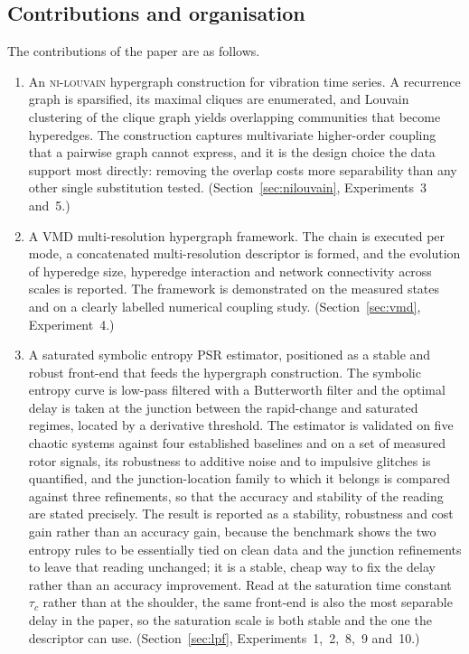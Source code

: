 \documentclass[10pt,a4paper,twocolumn]{article}
\newcommand{\nilouvain}{\textsc{ni-louvain}}
\begin{document}
\subsection{Contributions and organisation}

The contributions of the paper are as follows.

\begin{enumerate}
\item An \nilouvain{} hypergraph construction for vibration time series.  A
recurrence graph is sparsified, its maximal cliques are enumerated, and
Louvain clustering of the clique graph yields overlapping communities that
become hyperedges.  The construction captures multivariate higher-order
coupling that a pairwise graph cannot express, and it is the design choice the
data support most directly: removing the overlap costs more separability than
any other single substitution tested.
(Section~\ref{sec:nilouvain}, Experiments~3 and~5.)
\item A VMD multi-resolution hypergraph framework.  The chain is executed per
mode, a concatenated multi-resolution descriptor is formed, and the evolution
of hyperedge size, hyperedge interaction and network connectivity across
scales is reported.  The framework is demonstrated on the measured states and
on a clearly labelled numerical coupling study.
(Section~\ref{sec:vmd}, Experiment~4.)
\item A saturated symbolic entropy PSR estimator, positioned as a stable and
robust front-end that feeds the hypergraph construction.  The symbolic
entropy curve is low-pass filtered with a Butterworth filter and the optimal
delay is taken at the junction between the rapid-change and saturated regimes,
located by a derivative threshold.  The estimator is validated on five chaotic
systems against four established baselines and on a set of measured rotor
signals, its robustness to additive noise and to impulsive glitches is
quantified, and the junction-location family to which it belongs is compared
against three refinements, so that the accuracy and stability of the reading
are stated precisely.  The result is reported as a stability, robustness and
cost gain rather than an accuracy gain, because the benchmark shows the two
entropy rules to be essentially tied on clean data and the junction refinements
to leave that reading unchanged; it is a stable, cheap way to fix the delay
rather than an accuracy improvement.  Read at the saturation time constant
$\tau_c$ rather than at the shoulder, the same front-end is also the most
separable delay in the paper, so the saturation scale is both stable and the
one the descriptor can use.
(Section~\ref{sec:lpf}, Experiments~1,~2,~8,~9 and~10.)
\end{enumerate}
\end{document}
